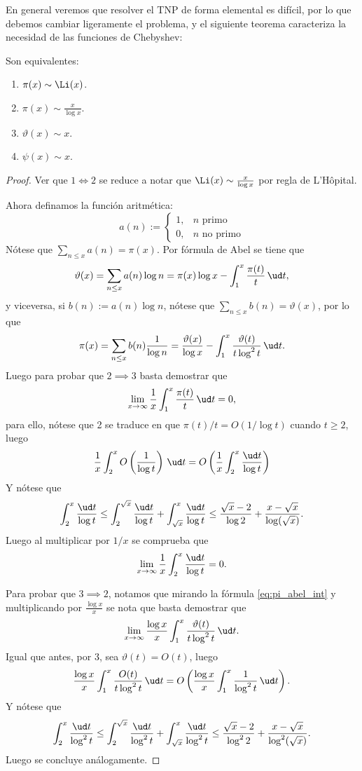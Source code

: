 \documentclass[teoria-numeros.tex]{subfiles}
\begin{document}
En general veremos que resolver el TNP de forma elemental es difícil, por lo que debemos cambiar ligeramente el problema,
y el siguiente teorema caracteriza la necesidad de las funciones de Chebyshev:
\begin{thm}
	Son equivalentes:
	\begin{enumerate}
		\item $ \pi(x) \sim \Li(x) $.
		\item $ \displaystyle\pi(x) \sim \frac{x}{\log x} $.
		\item $ \vartheta(x) \sim x $.
		\item $ \psi(x) \sim x $.
	\end{enumerate}
\end{thm}
\begin{proof}
	Ver que $1 \iff 2$ se reduce a notar que $\Li(x) \sim \frac{x}{\log x}$ por regla de L'Hôpital.

	Ahora definamos la función aritmética:
	$$ a(n) :=
	\begin{cases}
		1, & n\text{ primo} \\
		0, & n\text{ no primo}
	\end{cases} $$
	Nótese que $\sum_{n\le x} a(n) = \pi(x)$.
	Por fórmula de Abel se tiene que
	$$ \vartheta(x) = \sum_{n\le x} a(n)\log n = \pi(x)\log x - \int_{1}^{x} \frac{\pi(t)}{t} \, \ud t, $$
	y viceversa, si $b(n) := a(n)\log n$, nótese que $\sum_{n\le x} b(n) = \vartheta(x)$, por lo que
	\begin{equation}\label{eq:pi_abel_int}
		\pi(x) = \sum_{n\le x} b(n) \frac{1}{\log n} = \frac{\vartheta(x)}{\log x} - \int_{1}^{x} \frac{\vartheta(t)}{t \log^2 t} \, \ud t.
	\end{equation}
	Luego para probar que $2 \implies 3$ basta demostrar que
	$$ \lim_{x\to\infty} \frac{1}{x} \int_{1}^{x} \frac{\pi(t)}{t} \, \ud t = 0, $$
	para ello, nótese que 2 se traduce en que $\pi(t)/t = O(1/\log t)$ cuando $t \ge 2$, luego
	$$ \frac{1}{x} \int_{2}^{x} O\left( \frac{1}{\log t} \right) \, \ud t = O\left( \frac{1}{x} \int_{2}^{x} \frac{\ud t}{\log t} \right) $$
	Y nótese que
	$$ \int_{2}^{x} \frac{\ud t}{\log t} \le \int_{2}^{\sqrt{x}} \frac{\ud t}{\log t} + \int_{\sqrt{x}}^{x} \frac{\ud t}{\log t}
	\le \frac{\sqrt{x} - 2}{\log 2} + \frac{x - \sqrt{x}}{\log( \sqrt{x} )}. $$
	Luego al multiplicar por $1/x$ se comprueba que
	$$ \lim_{x\to\infty} \frac{1}{x} \int_{2}^{x} \frac{\ud t}{\log t} = 0. $$

	Para probar que $3 \implies 2$, notamos que mirando la fórmula \eqref{eq:pi_abel_int} y multiplicando por $\frac{\log x}{x}$ se nota
	que basta demostrar que
	$$ \lim_{x\to\infty} \frac{\log x}{x} \int_{1}^{x} \frac{\vartheta(t)}{t \log^2 t} \, \ud t. $$
	Igual que antes, por 3, sea $\vartheta(t) = O(t)$, luego
	$$ \frac{\log x}{x} \int_{1}^{x} \frac{O(t)}{t \log^2 t} \, \ud t = O\left( \frac{\log x}{x} \int_{1}^{x} \frac{1}{\log^2 t} \, \ud t \right). $$
	Y nótese que
	$$ \int_{2}^{x} \frac{\ud t}{\log^2 t} \le \int_{2}^{\sqrt{x}} \frac{\ud t}{\log^2 t} + \int_{\sqrt{x}}^{x} \frac{\ud t}{\log^2 t}
	\le \frac{\sqrt{x} - 2}{\log^2 2} + \frac{x - \sqrt{x}}{\log^2( \sqrt{x} )}. $$
	Luego se concluye análogamente.


\end{proof}
\end{document}
